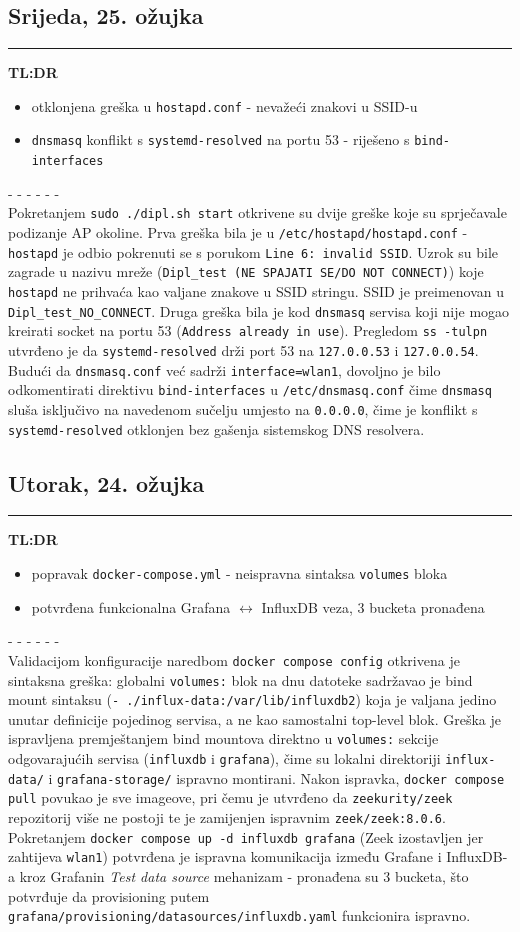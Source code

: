 \documentclass[12pt, a4paper]{article}
\newcommand{\dan}[1]{
    \subsection*{#1}
    \vspace{-0.5em} 
    \hrule \vspace{0.5em} 
}
\begin{document}
\dan{Srijeda, 25. ožujka}
\textbf{TL:DR}
\begin{itemize}
    \item otklonjena greška u \lstinline|hostapd.conf| - nevažeći znakovi u SSID-u
    \item \lstinline|dnsmasq| konflikt s \lstinline|systemd-resolved| na portu 53 - riješeno s \lstinline|bind-interfaces|
\end{itemize}
- - - - - - \\
Pokretanjem \lstinline|sudo ./dipl.sh start| otkrivene su dvije greške koje su sprječavale
podizanje AP okoline.
Prva greška bila je u \lstinline|/etc/hostapd/hostapd.conf| - \lstinline|hostapd| je odbio
pokrenuti se s porukom \lstinline|Line 6: invalid SSID|.
Uzrok su bile zagrade u nazivu mreže (\lstinline|Dipl_test (NE SPAJATI SE/DO NOT CONNECT)|)
koje \lstinline|hostapd| ne prihvaća kao valjane znakove u SSID stringu.
SSID je preimenovan u \lstinline|Dipl_test_NO_CONNECT|.
Druga greška bila je kod \lstinline|dnsmasq| servisa koji nije mogao kreirati socket na portu 53
(\lstinline|Address already in use|).
Pregledom \lstinline|ss -tulpn| utvrđeno je da \lstinline|systemd-resolved| drži port 53
na \lstinline|127.0.0.53| i \lstinline|127.0.0.54|.
Budući da \lstinline|dnsmasq.conf| već sadrži \lstinline|interface=wlan1|, dovoljno je bilo
odkomentirati direktivu \lstinline|bind-interfaces| u \lstinline|/etc/dnsmasq.conf| čime
\lstinline|dnsmasq| sluša isključivo na navedenom sučelju umjesto na \lstinline|0.0.0.0|,
čime je konflikt s \lstinline|systemd-resolved| otklonjen bez gašenja sistemskog DNS resolvera.
 
\dan{Utorak, 24. ožujka}
\textbf{TL:DR}
\begin{itemize}
    \item popravak \lstinline|docker-compose.yml| - neispravna sintaksa \lstinline|volumes| bloka
    \item potvrđena funkcionalna Grafana $\leftrightarrow$ InfluxDB veza, 3 bucketa pronađena
\end{itemize}
- - - - - - \\
Validacijom konfiguracije naredbom \lstinline|docker compose config| otkrivena je sintaksna greška:
globalni \lstinline|volumes:| blok na dnu datoteke sadržavao je bind mount sintaksu
(\lstinline|- ./influx-data:/var/lib/influxdb2|) koja je valjana jedino unutar definicije pojedinog
servisa, a ne kao samostalni top-level blok.
Greška je ispravljena premještanjem bind mountova direktno u \lstinline|volumes:| sekcije
odgovarajućih servisa (\lstinline|influxdb| i \lstinline|grafana|), čime su lokalni
direktoriji \lstinline|influx-data/| i \lstinline|grafana-storage/| ispravno montirani.
Nakon ispravka, \lstinline|docker compose pull| povukao je sve imageove, pri čemu je utvrđeno
da \lstinline|zeekurity/zeek| repozitorij više ne postoji te je zamijenjen ispravnim
\lstinline|zeek/zeek:8.0.6|.
Pokretanjem \lstinline|docker compose up -d influxdb grafana| (Zeek izostavljen jer zahtijeva
\lstinline|wlan1|) potvrđena je ispravna komunikacija između Grafane i InfluxDB-a kroz
Grafanin \textit{Test data source} mehanizam - pronađena su 3 bucketa, što potvrđuje
da provisioning putem \lstinline|grafana/provisioning/datasources/influxdb.yaml| funkcionira ispravno.
 
\end{document}
